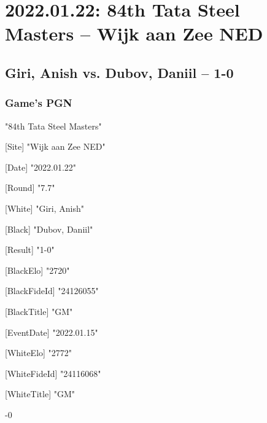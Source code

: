 \documentclass[9pt]{extarticle}
\begin{document}
\section*{2022.01.22: 84th Tata Steel Masters -- Wijk aan Zee NED}

\subsection*{Giri, Anish vs. Dubov, Daniil -- 1-0}
\subsubsection*{Game's PGN}
\begin{flushleft}
[Event] "84th Tata Steel Masters"

[Site] "Wijk aan Zee NED"

[Date] "2022.01.22"

[Round] "7.7"

[White] "Giri, Anish"

[Black] "Dubov, Daniil"

[Result] "1-0"

[BlackElo] "2720"

[BlackFideId] "24126055"

[BlackTitle] "GM"

[EventDate] "2022.01.15"

[WhiteElo] "2772"

[WhiteFideId] "24116068"

[WhiteTitle] "GM"

\end{flushleft}
\begin{flushleft}
 \quad  {}-0
\end{flushleft}
\parindent 0mm
\end{document}

